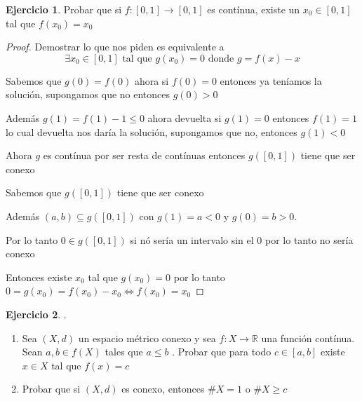 \documentclass[11pt]{report}
\newcommand{\R}{\mathbb{R}}
\newcommand{\ra}{\rightarrow}
\theoremstyle{definition}
\newtheorem{ej}{Ejercicio}
\begin{document}
\begin{ej}
	Probar que si $f: [0,1] \ra [0,1]$ es contínua, existe un $x_0 \in [0,1]$ tal que $f(x_0) = x_0$
	\begin{proof}
		Demostrar lo que nos piden es equivalente a 
		$$\exists x_0 \in [0,1] \text{ tal que } g(x_0) = 0 \text{ donde } g = f(x) - x $$
		
		Sabemos que $g(0) = f(0)$ ahora si $f(0) = 0$ entonces ya teníamos la solución, supongamos que no entonces $g(0) > 0$

		Además $g(1) = f(1) - 1 \leq 0 $ ahora devuelta si $g(1) = 0$ entonces $f(1) = 1$ lo cual devuelta nos daría la solución, supongamos que no, entonces $g(1) < 0$

		Ahora $g$ es contínua por ser resta de contínuas entonces $g([0,1])$ tiene que ser conexo 

		Sabemos que $g([0,1])$ tiene que ser conexo 

		Además $(a,b) \subseteq g([0,1])$ con $g(1) = a < 0$ y $g(0) = b > 0$. 

		Por lo tanto $0 \in g([0,1]) $ si nó sería un intervalo sin el $0$ por lo tanto no sería conexo

		Entonces existe $x_0$ tal que $g(x_0) = 0$ por lo tanto $0 = g(x_0) = f(x_0) - x_0 \iff f(x_0) = x_0$

	\end{proof}
\end{ej}

\begin{ej}.

\begin{enumerate}
	\item Sea $(X,d)$ un espacio métrico conexo y sea $f : X \ra \R$ una función contínua. Sean $a,b \in f(X)$ tales que $a \leq b$ . Probar que para todo $c \in [a,b]$ existe $x \in X$ tal que $f(x) = c$
	\item Probar que si $(X,d)$ es conexo, entonces $\# X = 1$ o $\# X \geq c$
\end{enumerate}
\end{ej}
\end{document}
